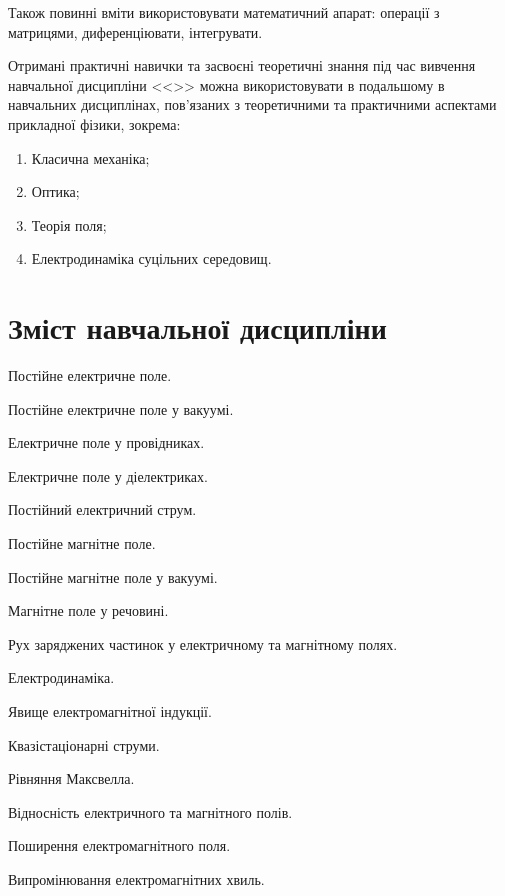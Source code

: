 \documentclass{Syllabus}
\begin{document}
Також повинні вміти використовувати математичний апарат: операції з матрицями,  диференціювати, інтегрувати.

Отримані практичні навички та засвоєні теоретичні знання під час вивчення навчальної дисципліни <<\discipline>> можна використовувати в подальшому в навчальних дисциплінах, пов’язаних з теоретичними та практичними аспектами прикладної фізики, зокрема:

\begin{enumerate}
	\item Класична механіка;
	\item Оптика;
	\item Теорія поля;
	\item Електродинаміка суцільних середовищ.
\end{enumerate}


\section{Зміст навчальної дисципліни}


\begin{Rozdil}
	\item Постійне електричне поле.
	\begin{Rozdil}
		\item Постійне електричне поле у вакуумі.
		\item Електричне поле у провідниках.
        \item Електричне поле у діелектриках.
	\end{Rozdil}
    \item Постійний електричний струм.
	\item Постійне магнітне поле.
	\begin{Rozdil}
		\item Постійне магнітне поле у вакуумі.
		\item Магнітне поле у речовині.
	\end{Rozdil}
    \item Рух заряджених частинок у електричному та магнітному полях.
	\item Електродинаміка.
	\begin{Rozdil}
        \item Явище електромагнітної індукції.
        \item Квазістаціонарні струми.
        \item Рівняння Максвелла.
        \item Відносність електричного та магнітного полів.
		\item Поширення електромагнітного поля.
		\item Випромінювання електромагнітних хвиль.
	\end{Rozdil}
\end{Rozdil}
\end{document}
